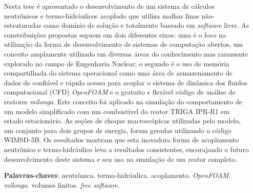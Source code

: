 \documentclass[12pt,openright,twoside,a4paper,english,french,spanish,brazil]{abntex2}
\begin{document}
\begin{resumo}

  Nesta tese é apresentado o desenvolvimento de um sistema de cálculos
  neutrônicos e termo-hidráulicos acoplado que utiliza malhas finas não-estruturadas
  como domínio de solução e totalmente baseado em \textit{software} livre.
  As constribuições propostas seguem em dois diferentes eixos: uma é o foco na utilização
  da forma de desenvolvimento de sistemas de computação abertos, um conceito amplamente
  utilizado em diversas áreas do conhecimento mas raramente explorado no campo de Engenharia Nuclear;
  o segundo é o uso de memória compartilhada do sistema operacional como uma área de armazenamento
  de dados de confiável e rápido acesso para acoplar o sistema de dinâmica dos fluidos computacional
  (CFD) \textit{OpenFOAM} e o gratuito e flexível código de análise de reatores \textit{milonga}.
  Este conceito foi aplicado na simulação do comportamento de um modelo simplificado com um combustível
  do reator TRIGA IPR-R1 em estado estacionário. As seções de choque macroscópicas utilizadas pelo
  modelo, um conjunto para dois grupos de energia, foram geradas utilizando o código WIMSD-5B.
  Os resultados mostram que esta inovadora forma de acoplamento neutrônico e termo-hidráulico leva
  a resultados consistentes,
  encorajando o futuro desenvolvimento deste sistema e seu uso na simulação de um reator completo.


 \vspace{\onelineskip}
    
 \noindent
 \textbf{Palavras-chaves}: neutrônica. termo-hidráulica. acoplamento. \textit{OpenFOAM}. \textit{milonga}. volumes finitos. \textit{free software}.
\end{resumo}
\end{document}
